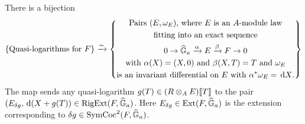 \documentclass[../main.tex]{subfiles}
\begin{document}
\begin{thm}
  \label{thm:RigExtStr}
  There is a bijection
  \begin{equation}\label{eq:QLogBijection}
    \{\text{Quasi-logarithms for $F$}\} \xrightarrow{\sim} 
      \left\{
      \begin{gathered}
        \text{Pairs $(E, \omega_E)$, where $E$ is an $A$-module law} \\
        \text{fitting into  an exact sequence}
        \\ 0 \to \widehat{\mathbb{G}}_a \xrightarrow{\alpha} E \xrightarrow{\beta} F \to 0 \\
        \text{with $\alpha(X) = (X, 0)$ and $\beta(X, T) = T$ and $\omega_E$} \\
        \text{is an invariant differential on $E$ with 
        $\alpha^* \omega_E = \, \mathrm{d} X$.} \\
      \end{gathered}
      \right\}
  \end{equation}
The map sends any quasi-logarithm $g(T) \in (R\otimes_A E)\llbracket T \rrbracket$
to the pair $(E_{\delta g}, \, \mathrm{d} (X + g(T)) \in \operatorname {RigExt}(F, \widehat{\mathbb{G}}_a)$. Here
$E_{\delta g} \in \operatorname{Ext}(F, \widehat{\mathbb{G}}_a)$ is the extension corresponding to 
$\delta g \in \operatorname{SymCoc}^2(F,\widehat{\mathbb{G}}_a)$. 


\end{thm}
\end{document}
